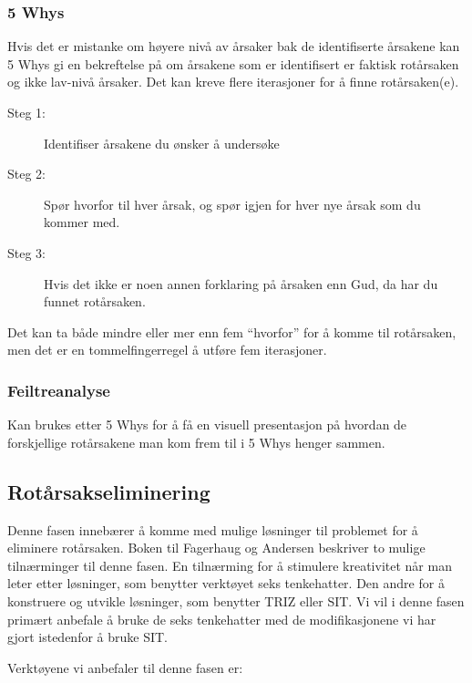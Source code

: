\subsubsection{5 Whys} 
Hvis det er mistanke om høyere nivå av årsaker bak de identifiserte årsakene kan 5 Whys gi en bekreftelse på om årsakene som er identifisert er faktisk rotårsaken og ikke lav-nivå årsaker. Det kan kreve flere iterasjoner for å finne rotårsaken(e).  
    \begin{description}
        \item[Steg 1:] Identifiser årsakene du ønsker å undersøke
        \item[Steg 2:] Spør hvorfor til hver årsak, og spør igjen for hver nye årsak som du kommer med.
        \item[Steg 3:] Hvis det ikke er noen annen forklaring på årsaken enn Gud, da har du funnet rotårsaken.
    \end{description}
Det kan ta både mindre eller mer enn fem ``hvorfor'' for å komme til rotårsaken, men det er en tommelfingerregel å utføre fem iterasjoner. 
    
\subsubsection{Feiltreanalyse} 
Kan brukes etter 5 Whys for å få en visuell presentasjon på hvordan de forskjellige rotårsakene man kom frem til i 5 Whys henger sammen.


\subsection{Rotårsakseliminering}
Denne fasen innebærer å komme med mulige løsninger til problemet for å eliminere rotårsaken. Boken til Fagerhaug og Andersen \cite{RCA} beskriver to mulige tilnærminger til denne fasen. En tilnærming for å stimulere kreativitet når man leter etter løsninger, som benytter verktøyet seks tenkehatter. Den andre for å konstruere og utvikle løsninger, som benytter TRIZ eller SIT. Vi vil i denne fasen primært anbefale å bruke de seks tenkehatter med de modifikasjonene vi har gjort istedenfor å bruke SIT.

Verktøyene vi anbefaler til denne fasen er:
